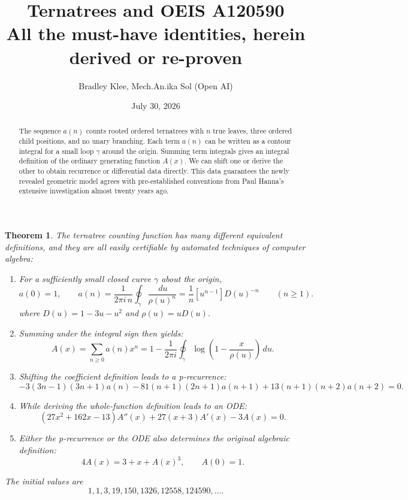 \documentclass[11pt,fleqn]{article}
\title{\vspace{-2.1em}\textbf{Ternatrees and OEIS A120590}\\[0.3em]
	\large All the must-have identities, herein derived or re-proven}
\author{Bradley Klee, \quad Mech.An.ika Sol \textnormal{(Open AI)}}
\date{July 30, 2026}
\theoremstyle{plain}
\newtheorem*{theorem}{Theorem}
\newcommand{\dd}{\,d}
\begin{document}
	\maketitle
	
	
	\thispagestyle{empty}
	
	\begin{abstract}
		The sequence $a(n)$ counts rooted ordered ternatrees with $n$ true leaves,
		three ordered child positions, and no unary branching. Each term $a(n)$ can be written as a contour integral 
		for a small loop $\gamma$ around the origin. Summing term integrals gives an 
		integral definition of the ordinary generating function $A(x)$. We can shift 
		one or derive the other to obtain recurrence or differential data directly. 
		This data guarantees the newly revealed geometric model agrees with 
		pre-established conventions from Paul Hanna's extensive investigation 
		almost twenty years ago.  
	\end{abstract}
	
	\begin{theorem}
		The ternatree counting function has many different equivalent definitions,
		and they are all easily certifiable by automated techniques of computer algebra:  
		\begin{enumerate}[label=(\arabic*),leftmargin=2.2em,itemsep=0.55em,topsep=0.35em]
			\item For a sufficiently small closed curve $\gamma$ about the origin,
			\[
			a(0)=1,\qquad
			a(n)=\frac{1}{2\pi i\,n}\oint_\gamma\frac{\dd u}{\rho(u)^n}
			=\frac1n[u^{n-1}]D(u)^{-n}\qquad(n\ge1).
			\]
			where $D(u)=1-3u-u^2$ and $\rho(u)=uD(u)$. 
			
			\item Summing under the integral sign then yields: 
			\[
			A(x)=\sum_{n\geq0}a(n)x^n  = 1-\frac{1}{2\pi i}\oint_\gamma
			\log\!\left(1-\frac{x}{\rho(u)}\right)\dd u.
			\]
			\item Shifting the coefficient definition leads to a p-recurrence:
			\small \[
			-3(3n-1)(3n+1)a(n)-81(n+1)(2n+1)a(n+1)+13(n+1)(n+2)a(n+2)=0.
			\]
			
			\item While deriving the whole-function definition leads to an ODE:
			\[
			(27x^2+162x-13)A''(x)+27(x+3)A'(x)-3A(x)=0.
			\]
			\item Either the p-recurrence or the ODE also determines the original 
			algebraic definition: 
			\[
			4A(x)=3+x+A(x)^3,\qquad A(0)=1.
			\]
			
		\end{enumerate}
		The initial values are
		\[
		1,1,3,19,150,1326,12558,124590,\ldots.
		\]
	\end{theorem}
	
\end{document}
